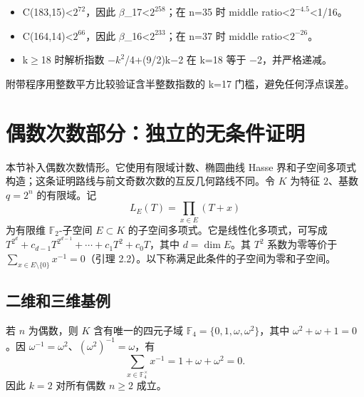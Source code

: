 \documentclass[11pt]{ctexart}
\begin{document}
\begin{itemize}

\item C(183,15)<\ensuremath{2^{72}}，因此 \ensuremath{\beta}\_17<\ensuremath{2^{258}}；在 n=35 时 middle ratio<\ensuremath{2^{-4.5}}<1/16。

\item C(164,14)<\ensuremath{2^{66}}，因此 \ensuremath{\beta}\_16<\ensuremath{2^{233}}；在 n=37 时 middle ratio<\ensuremath{2^{-26}}。

\item k\ensuremath{\ge}18 时解析指数 −\ensuremath{k^2}/4+(9/2)k−2 在 k=18 等于 −2，并严格递减。

\end{itemize}

附带程序用整数平方比较验证含半整数指数的 k=17 门槛，避免任何浮点误差。

\section{偶数次数部分：独立的无条件证明}

本节补入偶数次数情形。它使用有限域计数、椭圆曲线 Hasse 界和子空间多项式构造；这条证明路线与前文奇数次数的互反几何路线不同。令 $K$ 为特征 $2$、基数 $q=2^n$ 的有限域。记
\[
L_E(T)=\prod_{x\in E}(T+x)
\]
为有限维 $\mathbb F_2$-子空间 $E\subset K$ 的子空间多项式。它是线性化多项式，可写成 $T^{2^d}+c_{d-1}T^{2^{d-1}}+\cdots+c_1T^2+c_0T$，其中 $d=\dim E$。其 $T^2$ 系数为零等价于 $\sum_{x\in E\setminus\{0\}}x^{-1}=0$（引理 2.2）。以下称满足此条件的子空间为零和子空间。

\subsection{二维和三维基例}

若 $n$ 为偶数，则 $K$ 含有唯一的四元子域 $\mathbb F_4=\{0,1,\omega,\omega^2\}$，其中 $\omega^2+\omega+1=0$。因 $\omega^{-1}=\omega^2$、$(\omega^2)^{-1}=\omega$，有
\[
\sum_{x\in\mathbb F_4^\times}x^{-1}=1+\omega+\omega^2=0.
\]
因此 $k=2$ 对所有偶数 $n\ge2$ 成立。
\end{document}
